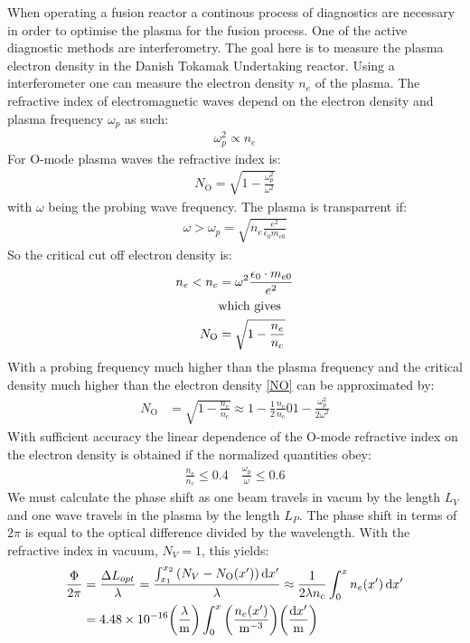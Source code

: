 When operating a fusion reactor a continous process of diagnostics are necessary in order to optimise the plasma for the fusion process. One of the active diagnostic methods are interferometry.
The goal here is to measure the plasma electron density in the Danish Tokamak Undertaking reactor.
Using a interferometer one can measure the electron density \(n_e\) of the plasma. The refractive index of electromagnetic waves depend on the electron density and plasma frequency \(\omega_p\) as such:
\begin{align}
	\omega_p^2 \propto n_e
\end{align}
For O-mode plasma waves the refractive index is:
\begin{align}
	N_{\mathrm{O}} = \sqrt{1-\frac{\omega_p^2}{\omega^2}}
\end{align}
with \(\omega\) being the probing wave frequency.
The plasma is transparrent if:
\begin{align}
	\omega > \omega_p = \sqrt{n_e\frac{e^2}{\epsilon_0 m_{e0}}}
\end{align}
So the critical cut off electron density is:
\begin{align}
	n_e < n_c      & = \omega^2\frac{\epsilon_0\cdot m_{e0}}{e^2} \label{nenc} \\
	               & \qq*{which gives} \nonumber                               \\
	N_{\mathrm{O}} & = \sqrt{1-\frac{n_e}{n_c}}\label{NO}
\end{align}
With a probing frequency much higher than the plasma frequency and the critical density much higher than the electron density \cref{NO} can be approximated by:
\begin{align}
	N_{\mathrm{O}} & = \sqrt{1-\frac{n_e}{n_c}} \approx 1-\frac{1}{2}\frac{n_e}{n_c} 0 1-\frac{\omega_p^2}{2\omega^2}
\end{align}
With sufficient accuracy the linear dependence of the O-mode refractive index on the electron density is obtained if the normalized quantities obey:
\begin{align}
	\frac{n_e}{n_c} \leq 0.4 \quad \frac{\omega_p}{\omega} \leq 0.6
\end{align}
We must calculate the phase shift as one beam travels in vacum by the length \(L_V\) and one wave travels in the plasma by the length \(L_P\). The phase shift in terms of \(2 \pi\) is equal to the optical difference divided by the wavelength. With the refractive index in vacuum, \(N_V=1\), this yields:
\begin{align}
	\frac{\Phi}{2\pi} & = \frac{\Delta L_{opt}}{\lambda} = \frac{\int_{x_1}^{x_2}\pqty{N_V-N_{\mathrm{O}}(x')}\dd{x'}}{\lambda} \approx \frac{1}{2\lambda n_c}\int_{0}^{x}n_e(x')\dd{x'} \\
	                  & = 4.48\times 10^{-16} \pqty{\frac{\lambda}{\si{\meter}}}\int_{0}^{x}\pqty{\frac{n_e(x')}{\si{\per\meter\cubed}}}\pqty{\frac{\dd{x'}}{\si{\meter}}}
\end{align}
